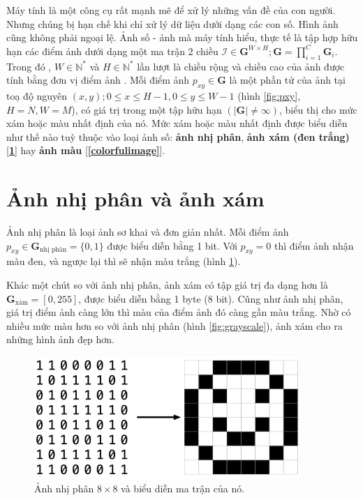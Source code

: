 \documentclass[a4paper, 12pt]{report}
\begin{document}
Máy tính là một công cụ rất mạnh mẽ để xử lý những vấn đề của con người.
Nhưng chúng bị hạn chế khi chỉ xử lý dữ liệu dưới dạng các con số.
Hình ảnh cũng không phải ngoại lệ.
Ảnh số - ảnh mà máy tính hiểu, thực tế là tập hợp hữu hạn các điểm ảnh dưới dạng một ma trận 2 chiều $\mathcal{I} \in \bm{G}^{W\times H}; \bm{G} = \prod_{i=1}^{C}\bm{G}_i$.
Trong đó , $W \in \mathbb{N}^*$ và $H \in \mathbb{N}^*$ lần lượt là chiều rộng và chiều cao của ảnh được tính bằng đơn vị điểm ảnh \cite{introtocvnttuan}.
Mỗi điểm ảnh $p_{xy} \in \bm{G}$ là một phần tử của ảnh tại toạ độ nguyên $(x, y); 0 \le x \le H - 1, 0 \le y \le  W - 1$ (hình \ref{fig:pxy}, $H=N, W=M$), có giá trị trong một tập hữu hạn $\left(\left|\bm{G}\right| \neq \infty\right)$, biểu thị cho mức xám hoặc màu nhất định của nó.
Mức xám hoặc màu nhất định được biểu diễn như thế nào tuỳ thuộc vào loại ảnh số: \textbf{ảnh nhị phân}, \textbf{ảnh xám (đen trắng)} [\textbf{\ref{grayimage}}] hay \textbf{ảnh màu} [\textbf{\ref{colorfulimage}}].

\section{Ảnh nhị phân và ảnh xám}\label{grayimage}

Ảnh nhị phân \cite{wikibinimg2021} là loại ảnh sơ khai và đơn giản nhất.
Mỗi điểm ảnh $p_{xy} \in \bm{G}_{\text{nhị phân}} = \{0, 1\}$ được biểu diễn bằng 1 bit.
Với $p_{xy} = 0$ thì điểm ảnh nhận màu đen, và ngược lại thì sẽ nhận màu trắng (hình \ref{fig:binimg}).\vspace{5pt}

Khác một chút so với ảnh nhị phân, ảnh xám \cite{wikigrayimg2021} có tập giá trị đa dạng hơn là $\bm{G}_{\text{xám}} = [0, 255]$, được biểu diễn bằng 1 byte (8 bit).
Cũng như ảnh nhị phân, giá trị điểm ảnh càng lớn thì màu của điểm ảnh đó càng gần màu trắng.
Nhờ có nhiều mức màu hơn so với ảnh nhị phân (hình \ref{fig:grayscale}), ảnh xám cho ra những hình ảnh đẹp hơn.

\begin{figure}[!h]
\captionsetup{width=0.8\textwidth}
\centering
\includegraphics[width=10cm]{images/binimg.png}
\caption{Ảnh nhị phân $8\times 8$ và biểu diễn ma trận của nó.}
\label{fig:binimg}
\end{figure}
\end{document}
